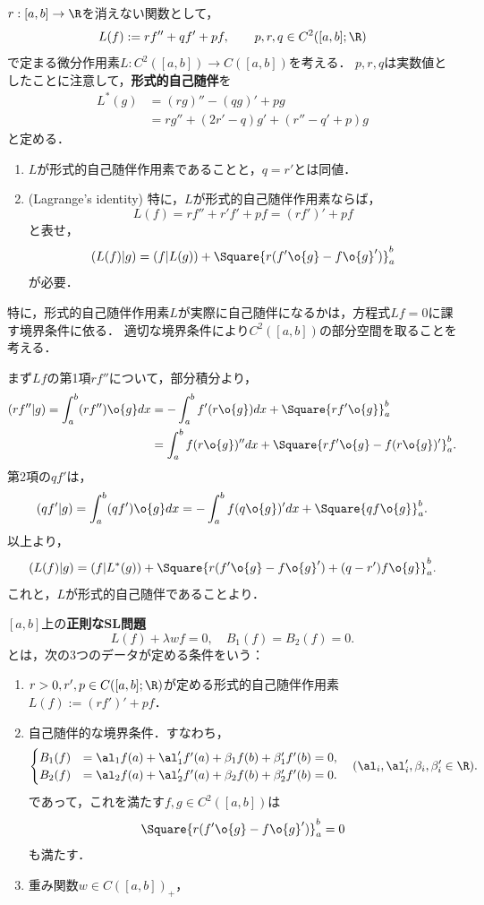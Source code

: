 \documentclass[uplatex,dvipdfmx]{jsreport}
\begin{document}
\begin{problem}
    $r:[a,b]\to\R$を消えない関数として，
    \[L(f):=rf''+qf'+pf,\qquad p,r,q\in C^2([a,b];\R)\]
    で定まる微分作用素$L:C^2([a,b])\to C([a,b])$を考える．
    $p,r,q$は実数値としたことに注意して，\textbf{形式的自己随伴}を
    \begin{align*}
        L^*(g)&=(rg)''-(qg)'+pg\\
        &=rg''+(2r'-q)g'+(r''-q'+p)g
    \end{align*}
    と定める．
\end{problem}

\begin{proposition}\mbox{}
    \begin{enumerate}
        \item $L$が形式的自己随伴作用素であることと，$q=r'$とは同値．
        \item (Lagrange's identity) 特に，$L$が形式的自己随伴作用素ならば，
        \[L(f)=rf''+r'f'+pf=(rf')'+pf\]
        と表せ，
        \[(L(f)|g)=(f|L(g))+\Square{r(f'\o{g}-f\o{g}')}^b_a\]
        が必要．
    \end{enumerate}
    特に，形式的自己随伴作用素$L$が実際に自己随伴になるかは，方程式$Lf=0$に課す境界条件に依る．
    適切な境界条件により$C^2([a,b])$の部分空間を取ることを考える．
\end{proposition}
\begin{Proof}
    まず$Lf$の第1項$rf''$について，部分積分より，
    \begin{align*}
        (rf''|g)=\int^b_a(rf'')\o{g}dx&=-\int^b_af'(r\o{g})dx+\Square{rf'\o{g}}^b_a\\
        &=\int^b_af(r\o{g})''dx+\Square{rf'\o{g}-f(r\o{g})'}^b_a.
    \end{align*}
    第2項の$qf'$は，
    \[(qf'|g)=\int^b_a(qf')\o{g}dx=-\int^b_af(q\o{g})'dx+\Square{qf\o{g}}^b_a.\]
    以上より，
    \[(L(f)|g)=(f|L^*(g))+\Square{r(f'\o{g}-f\o{g}')+(q-r')f\o{g}}^b_a.\]
    これと，$L$が形式的自己随伴であることより．
\end{Proof}

\begin{definition}
    $[a,b]$上の\textbf{正則なSL問題}
    \[L(f)+\lambda wf=0,\quad B_1(f)=B_2(f)=0.\]
    とは，次の3つのデータが定める条件をいう：
    \begin{enumerate}
        \item $r>0,r',p\in C([a,b];\R)$が定める形式的自己随伴作用素$L(f):=(rf')'+pf$．
        \item 自己随伴的な境界条件．すなわち，
        \[\begin{cases}
            B_1(f)&=\al_1f(a)+\al_1'f'(a)+\beta_1f(b)+\beta_1'f'(b)=0,\\
            B_2(f)&=\al_2f(a)+\al_2'f'(a)+\beta_2f(b)+\beta_2'f'(b)=0.
        \end{cases}\quad(\al_i,\al_i',\beta_i,\beta_i'\in\R).\]
        であって，これを満たす$f,g\in C^2([a,b])$は
        \[\Square{r(f'\o{g}-f\o{g}')}^b_a=0\]
        も満たす．
        \item 重み関数$w\in C([a,b])_+$，
    \end{enumerate}
\end{definition}
\end{document}
